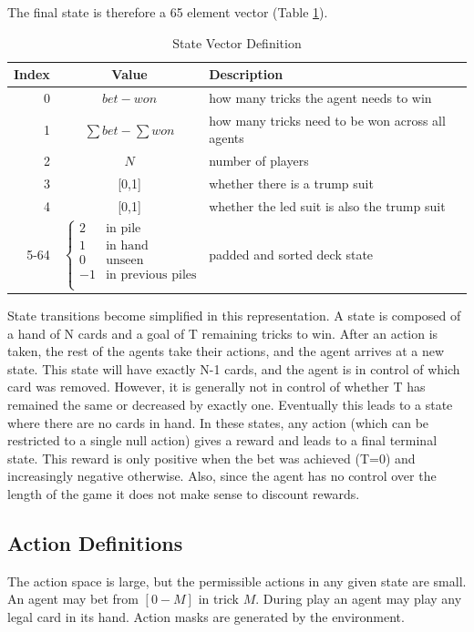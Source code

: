 \documentclass[10pt]{article} %
\begin{document}
The final state is therefore a 65 element vector (Table \ref{tab:state}).

\begin{table}[h!]
\centering
\begin{tabular}{r|c|l}
Index & Value & Description \\ \hline
0 & $bet - won$ & how many tricks the agent needs to win \\
1 & $\sum bet - \sum won$ & how many tricks need to be won across all agents \\
2 & $N$ & number of players \\
3 & [0,1] & whether there is a trump suit \\
4 & [0,1] & whether the led suit is also the trump suit \\
5-64 &
$\begin{cases}
2 & \text{in pile} \\
1 & \text{in hand} \\
0 & \text{unseen} \\
-1 & \text{in previous piles} \\
\end{cases}$
& padded and sorted deck state
\end{tabular}
\caption{State Vector Definition} \label{tab:state}
\end{table}

State transitions become simplified in this representation. A state is composed of a hand of N cards and a goal of T remaining tricks to win. After an action is taken, the rest of the agents take their actions, and the agent arrives at a new state. This state will have exactly N-1 cards, and the agent is in control of which card was removed. However, it is generally not in control of whether T has remained the same or decreased by exactly one. Eventually this leads to a state where there are no cards in hand. In these states, any action (which can be restricted to a single null action) gives a reward and leads to a final terminal state. This reward is only positive when the bet was achieved (T=0) and increasingly negative otherwise. Also, since the agent has no control over the length of the game it does not make sense to discount rewards.

\subsection{Action Definitions}

The action space is large, but the permissible actions in any given state are small. An agent may bet from $[0-M]$ in trick $M$. During play an agent may play any legal card in its hand. Action masks are generated by the environment.
\end{document}
